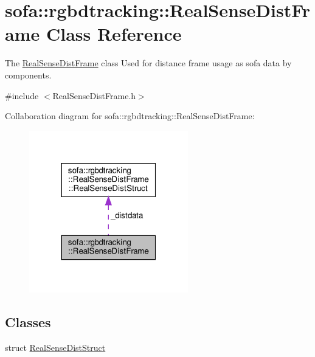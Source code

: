 \hypertarget{classsofa_1_1rgbdtracking_1_1_real_sense_dist_frame}{}\section{sofa\+:\+:rgbdtracking\+:\+:Real\+Sense\+Dist\+Frame Class Reference}
\label{classsofa_1_1rgbdtracking_1_1_real_sense_dist_frame}


The \hyperlink{classsofa_1_1rgbdtracking_1_1_real_sense_dist_frame}{Real\+Sense\+Dist\+Frame} class Used for distance frame usage as sofa data by components.  




{\ttfamily \#include $<$Real\+Sense\+Dist\+Frame.\+h$>$}



Collaboration diagram for sofa\+:\+:rgbdtracking\+:\+:Real\+Sense\+Dist\+Frame\+:\nopagebreak
\begin{figure}[H]
\begin{center}
\leavevmode
\includegraphics[width=196pt]{classsofa_1_1rgbdtracking_1_1_real_sense_dist_frame__coll__graph}
\end{center}
\end{figure}
\subsection*{Classes}
\begin{DoxyCompactItemize}
\item 
struct \hyperlink{structsofa_1_1rgbdtracking_1_1_real_sense_dist_frame_1_1_real_sense_dist_struct}{Real\+Sense\+Dist\+Struct}
\end{DoxyCompactItemize}
